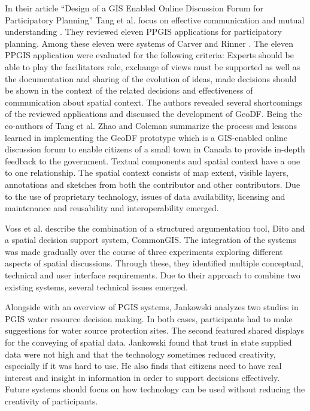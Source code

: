 In their article ``Design of a GIS Enabled Online Discussion Forum for Participatory Planning'' Tang et al. focus on effective communication and mutual understanding \cite{Tang2005_PPGIS_discussion_forum}. They reviewed eleven PPGIS applications for participatory planning. Among these eleven were systems of Carver \cite{Carver2001_PPGIS_Cyberdemocracy} and Rinner \cite{Rinner_ArgumentationMaps}. The eleven PPGIS application were evaluated for the following criteria: Experts should be able to play the facilitators role, exchange of views must be supported as well as the documentation and sharing of the evolution of ideas, made decisions should be shown in the context of the related decisions and effectiveness of communication about spatial context. The authors revealed several shortcomings of the reviewed applications and discussed the development of GeoDF. Being the co-authors of Tang et al. \cite{Tang2005_PPGIS_discussion_forum} Zhao and Coleman \cite{zhao2006geodf} summarize the process and lessons learned in implementing the GeoDF prototype which is a GIS-enabled online discussion forum to enable citizens of a small town in Canada to provide in-depth feedback to the government. Textual components and spatial context have a one to one relationship. The spatial context consists of map extent, visible layers, annotations and sketches from both the contributor and other contributors. Due to the use of proprietary technology, issues of data availability, licensing and maintenance and reusability and interoperability emerged.


Voss et al. \cite{Voss2004_Evolution_PGIS} describe the combination of a structured argumentation tool, Dito and a spatial decision support system, CommonGIS. The integration of the systems was made gradually over the course of three experiments exploring different aspects of spatial discussions. Through these, they identified multiple conceptual, technical and user interface requirements. Due to their approach to combine two existing systems, several technical issues emerged.

Alongside with an overview of PGIS systems, Jankowski \cite{Jankowski2005_community_based_pgis} analyzes two studies in PGIS water resource decision making. In both cases, participants had to make suggestions for water source protection sites. The second featured shared displays for the conveying of spatial data. Jankowski found that trust in state supplied data were not high and that the technology sometimes reduced creativity, especially if it was hard to use. He also finds that citizens need to have real interest and insight in information in order to support decisions effectively. Future systems should focus on how technology can be used without reducing the creativity of participants.




